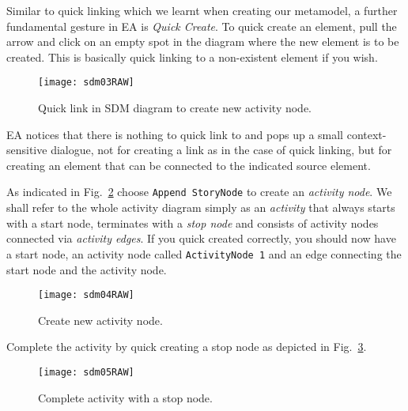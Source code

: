 \clearpage Similar to quick linking which we learnt when creating our metamodel, a further fundamental gesture in EA is \emph{Quick  Create}.
To quick create an element, pull the arrow and click on an empty spot in the diagram where the new element is to be created. This is basically quick linking to
a non-existent element if you wish.

\begin{figure}[htp]
\begin{center}
  \texttt{[image: sdm03RAW]}
  \caption{Quick link in SDM diagram to create new activity node.}  
  \label{fig:sdm_quicklink}
\end{center}
\end{figure}

EA notices that there is nothing to quick link to and pops up a small context-sensitive dialogue, not for creating a link as in the case of quick linking, but
for creating an element that can be connected to the indicated source element.

As indicated in Fig.~\ref{fig:sdm_new_activity_node} choose \texttt{Append StoryNode} to create an \emph{activity node}. We  
 shall refer to the whole activity diagram simply as an \emph{activity} that always starts with a start node, terminates with a \emph{stop
node} and consists of activity nodes connected via \emph{activity edges}. If you quick created correctly, you should now have a start node, an activity node
called \texttt{ActivityNode 1} and an edge connecting the start node and the activity node.

\begin{figure}[htp]
\begin{center}
  \texttt{[image: sdm04RAW]}
  \caption{Create new activity node.}  
  \label{fig:sdm_new_activity_node}
\end{center}
\end{figure}

Complete the activity by quick creating a stop node as depicted in Fig.~\ref{fig:sdm_stop_node}.

\begin{figure}[htp]
\begin{center}
  \texttt{[image: sdm05RAW]}
  \caption{Complete activity with a stop node.}  
  \label{fig:sdm_stop_node}
\end{center}
\end{figure}

